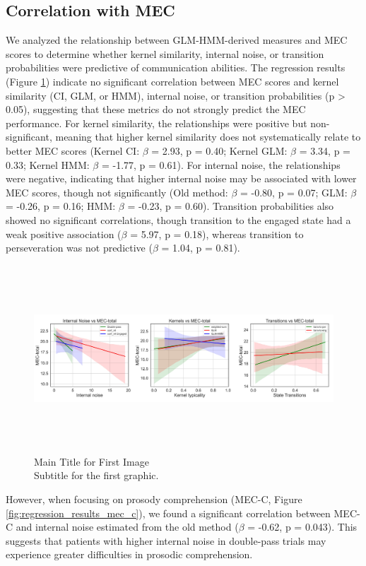 \subsection {Correlation with MEC} 
We analyzed the relationship between GLM-HMM-derived measures and MEC scores to determine whether kernel similarity, internal noise, or transition probabilities were predictive of communication abilities. The regression results (Figure \ref{fig:regression_results_mec}) indicate no significant correlation between MEC scores and kernel similarity (CI, GLM, or HMM), internal noise, or transition probabilities (p > 0.05), suggesting that these metrics do not strongly predict the MEC performance.  
For kernel similarity, the relationships were positive but non-significant, meaning that higher kernel similarity does not systematically relate to better MEC scores (Kernel CI: $\beta$ = 2.93, p = 0.40; Kernel GLM: $\beta$ = 3.34, p = 0.33; Kernel HMM: $\beta$ = -1.77, p = 0.61). For internal noise, the relationships were negative, indicating that higher internal noise may be associated with lower MEC scores, though not significantly (Old method: $\beta$ = -0.80, p = 0.07; GLM: $\beta$ = -0.26, p = 0.16; HMM: $\beta$ = -0.23, p = 0.60). Transition probabilities also showed no significant correlations, though transition to the engaged state had a weak positive association ($\beta$ = 5.97, p = 0.18), whereas transition to perseveration was not predictive ($\beta$ = 1.04, p = 0.81).
\begin{figure}[H]
    \centering
    \includegraphics[width=17cm,height=7cm]{MainLayout/Images/chapter8/regression_results_mec.jpg}
    \caption{Main Title for First Image \\ \small Subtitle for the first graphic.}
    \label{fig:regression_results_mec}
\end{figure}
However, when focusing on prosody comprehension (MEC-C, Figure \ref{fig:regression_results_mec_c}), we found a significant correlation between MEC-C and internal noise estimated from the old method ($\beta$ = -0.62, p = 0.043). This suggests that patients with higher internal noise in double-pass trials may experience greater difficulties in prosodic comprehension. 
